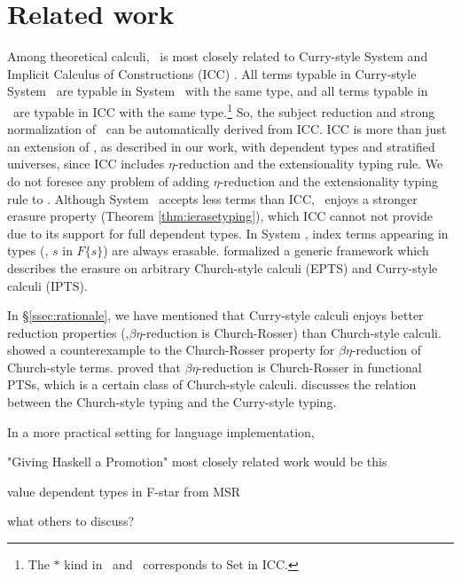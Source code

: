 \section{Related work}
\label{sec:relwork}
Among theoretical calculi, \Fi\ is most closely related to
Curry-style System \Fw \cite{AbeMatUus03,AbeMatUus05,GHR93}
and Implicit Calculus of Constructions (ICC) \cite{Miquel01}.
All terms typable in Curry-style System \Fw\ are typable in System \Fi\ 
with the same type, and all terms typable in \Fi\ are typable in ICC
with the same type.\footnote{The $*$ kind in \Fw\ and \Fi\ corresponds
	to \textsf{Set} in ICC.}
So, the subject reduction and strong normalization of \Fi\ 
can be automatically derived from ICC. ICC is more than just an extension of
\Fi, as described in our work, with dependent types and stratified universes,
since ICC includes $\eta$-reduction and the extensionality typing rule.
We do not foresee any problem of adding $\eta$-reduction and
the extensionality typing rule to \Fi. Although System \Fi\ accepts
less terms than ICC, \Fi\ enjoys a stronger erasure property
(Theorem \ref{thm:ierasetyping}), which ICC cannot not provide
due to its support for full dependent types. In System \Fi, index terms
appearing in types (\eg, $s$ in $F\{s\}$) are always erasable.
\citet{LingerS08} formalized a generic framework which describes the erasure on
arbitrary Church-style calculi (EPTS) and Curry-style calculi (IPTS).

In \S\ref{ssec:rationale}, we have mentioned that Curry-style calculi enjoys
better reduction properties (\eg,$\beta\eta$-reduction is Church-Rosser)
than Church-style calculi. \citet{Nederpelt73} showed a counterexample to
the Church-Rosser property for $\beta\eta$-reduction of Church-style terms.
\citet{Geuvers92} proved that $\beta\eta$-reduction is Church-Rosser
in functional PTSs, which is a certain class of Church-style calculi.
\citet{Seldin08} discusses the relation between the Church-style typing
and the Curry-style typing.

In a more practical setting for language implementation,

\citet{YorgeyWCJVM12}
"Giving Haskell a Promotion" 
most closely related work would be this

\citet{Swamy11}
value dependent types in F-star  from MSR


what others to discuss?

